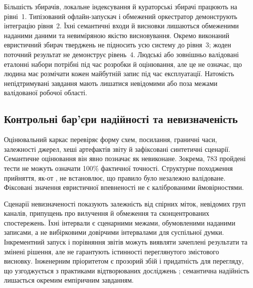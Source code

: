 Більшість збирачів, локальне індексування й кураторські збирачі працюють на рівні~1. Типізований офлайн-запускач і обмежений оркестратор демонструють інтеграцію рівня~2. Їхні семантичні входи й висновки лишаються обмеженими наданими даними та невиміряною якістю висновування. Окремо виконаний евристичний збирач тверджень не підносить усю систему до рівня~3; жоден поточний результат не демонструє рівень~4. Людські або зовнішньо валідовані еталонні набори потрібні під час розробки й оцінювання, але це не означає, що людина має розмічати кожен майбутній запис під час експлуатації. Натомість непідтримувані завдання мають лишатися невідомими або поза межами валідованої робочої області.

\subsection{Контрольні бар'єри надійності та невизначеність}
Оцінювальний каркас перевіряє форму схем, посилання, граничні часи, залежності джерел, хеші артефактів звіту й зафіксовані синтетичні сценарії. Семантичне оцінювання він явно позначає як невиконане. Зокрема, 783 пройдені тести не можуть означати 100\% фактичної точності. Структурне походження прийняття, як-от , не встановлює, що правило було незалежно валідоване. Фіксовані значення евристичної впевненості не є каліброваними ймовірностями.

Сценарії невизначеності показують залежність від спірних міток, невідомих груп каналів, припущень про вилучення й обмеження та сконцентрованих спостережень. Їхні інтервали є сценарними межами, обумовленими наданими записами, а не вибірковими довірчими інтервалами для суспільної думки. Інкрементний запуск і порівняння звітів можуть виявляти зачеплені результати та змінені рішення, але не гарантують істинності переглянутого змістового висновку. Інженерним пріоритетом є прозорий збій і придатність для перегляду, що узгоджується з практиками відтворюваних досліджень \citep{sandve2013reproducible,wilson2017practices}; семантична надійність лишається окремим емпіричним завданням.
